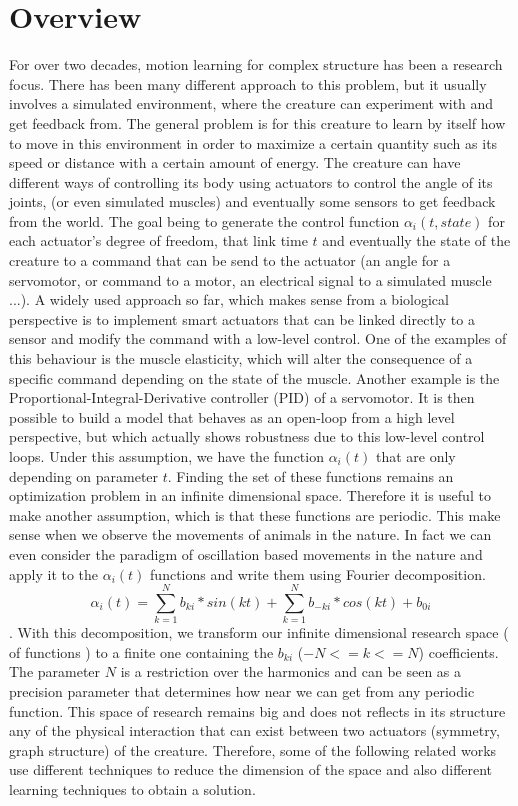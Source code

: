 \section{Overview}
For over two decades, motion learning for complex structure has been a research focus. There has been many different approach to this problem, but it usually involves a simulated environment, where the creature can experiment with and get feedback from. The general problem is for this creature to learn by itself how to move in this environment in order to maximize a certain quantity such as its speed or distance with a certain amount of energy. The creature can have different ways of controlling its body using actuators to control the angle of its joints, (or even simulated muscles) and eventually some sensors to get feedback from the world. The goal being to generate the control function  $\alpha_i(t, state) $ for each actuator's degree of freedom, that link time $t$ and eventually the state of the creature to a command that can be send to the actuator (an angle for a servomotor, or command to a motor, an electrical signal to a simulated muscle ...). A widely used approach so far, which makes sense from a biological perspective is to implement smart actuators that can be linked directly to a sensor and modify the command with a low-level control. One of the examples of this behaviour is the muscle elasticity, which will alter the consequence of a specific command depending on the state of the muscle. Another example is the Proportional-Integral-Derivative controller (PID) of a servomotor. It is then possible to build a model that behaves as an open-loop from a high level perspective, but which actually shows robustness due to this low-level control loops. 
Under this assumption, we have the function $\alpha_i(t)$ that are only depending on parameter $t$. Finding the set of these functions remains an optimization problem in an infinite dimensional space. Therefore it is useful to make another assumption, which is that these functions are periodic. This make sense when we observe the movements of animals in the nature. In fact we can even consider the paradigm of oscillation based movements in the nature and apply it to the $\alpha_i(t)$ functions and write them using Fourier decomposition. $$\alpha_i(t) = \sum_{k = 1}^N {b_{ki} * sin(kt)} + \sum_{k = 1}^N {b_{-ki} *  cos(kt)} + b_{0i} $$.
With this decomposition, we transform our infinite dimensional research space ( of functions ) to a finite one containing the $b_{ki}$ ($ -N <= k <= N $) coefficients. The parameter $N$ is a restriction over the harmonics and can be seen as a precision parameter that determines how near we can get from any periodic function. This space of research remains big and does not reflects in its structure any of the physical interaction that can exist between two actuators (symmetry, graph structure) of the creature. Therefore, some of the following related works use different techniques to reduce the dimension of the space and also different learning techniques to obtain a solution. 


